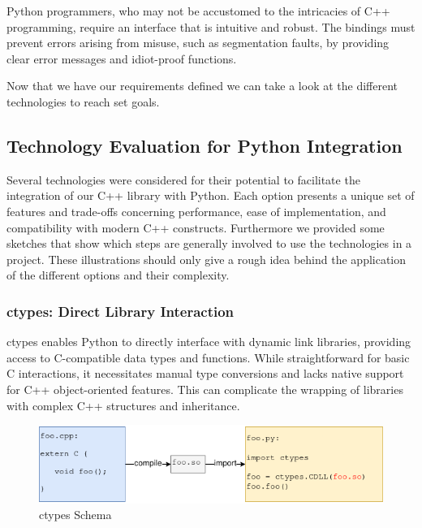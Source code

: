 Python programmers, who may not be accustomed to the intricacies of C++ programming, require an interface that is intuitive and robust. The bindings must prevent errors arising from misuse, such as segmentation faults, by providing clear error messages and idiot-proof functions.

Now that we have our requirements defined we can take a look at the different technologies to reach set goals.

\subsection{Technology Evaluation for Python Integration}

Several technologies were considered for their potential to facilitate the integration of our C++ library with Python. Each option presents a unique set of features and trade-offs concerning performance, ease of implementation, and compatibility with modern C++ constructs.
Furthermore we provided some sketches that show which steps are generally involved to use the technologies in a project. These illustrations should only give a rough idea behind the application of the different options and their complexity.

\subsubsection{ctypes: Direct Library Interaction}

ctypes enables Python to directly interface with dynamic link libraries, providing access to C-compatible data types and functions. While straightforward for basic C interactions, it necessitates manual type conversions and lacks native support for C++ object-oriented features. This can complicate the wrapping of libraries with complex C++ structures and inheritance. \cite{ctypes-docu}

\begin{figure}[htpb]
    \centering
    \includegraphics[width=\textwidth]{figures/Ctypes_schema.png}
    \caption{ctypes Schema}
    \label{fig:ctypes-schema}
\end{figure}



